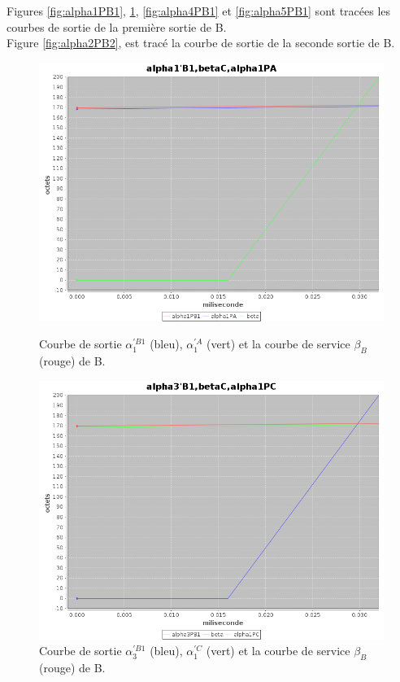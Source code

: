Figures \ref{fig:alpha1PB1}, \ref{fig:alpha3PB1}, \ref{fig:alpha4PB1} et \ref{fig:alpha5PB1} sont tracées les courbes de sortie de la première sortie de B. \\
Figure \ref{fig:alpha2PB2}, est tracé la courbe de sortie de la seconde sortie de B.

\begin{figure}[!ht]%
\begin{minipage}{.48\textwidth}%
\centering%
\noindent\includegraphics[width = \textwidth]{./II/images/alpha1PB1.png}%
\caption{\label{fig:alpha1PB1}Courbe de sortie $\alpha_{1}^{'B1}$ (bleu), $\alpha_{1} ^{'A}$ (vert) et la courbe de service $\beta_B$ (rouge) de B.}%
\end{minipage}\hfill%
\begin{minipage}{.48\textwidth}%
\centering%
\noindent\includegraphics[width = \textwidth]{./II/images/alpha3PB1.png}%
\caption{\label{fig:alpha3PB1}Courbe de sortie $\alpha_3 ^{'B1}$ (bleu), $\alpha_1^{'C}$ (vert) et la courbe de service $\beta_B$ (rouge) de B.}%
\end{minipage}\vspace{5mm}\newline 
\end{figure}
